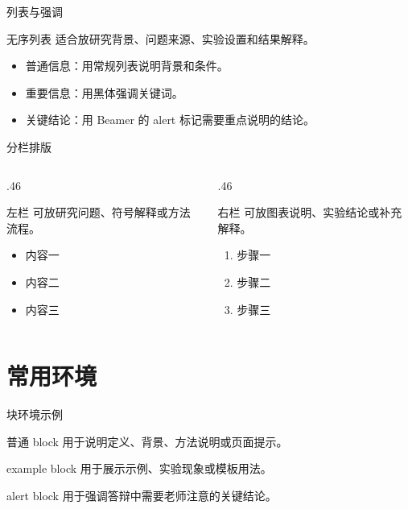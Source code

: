 \documentclass[12pt,aspectratio=43]{beamer}
\newcommand{\JLUEmph}[1]{{\JLUHei #1}}
\newcommand{\JLUSectionTitleThree}{常用环境}
\begin{document}
\begin{frame}{列表与强调}
  \begin{block}{无序列表}
    适合放研究背景、问题来源、实验设置和结果解释。
  \end{block}

  \begin{itemize}
    \item 普通信息：用常规列表说明背景和条件。
    \item \JLUEmph{重要信息}：用黑体强调关键词。
    \item \alert{关键结论}：用 Beamer 的 alert 标记需要重点说明的结论。
  \end{itemize}
\end{frame}

\begin{frame}{分栏排版}
  \begin{columns}[T,totalwidth=\textwidth]
    \begin{column}{.46\textwidth}
      \begin{block}{左栏}
        可放研究问题、符号解释或方法流程。
      \end{block}

      \begin{itemize}
        \item 内容一
        \item 内容二
        \item 内容三
      \end{itemize}
    \end{column}
    \begin{column}{.46\textwidth}
      \begin{block}{右栏}
        可放图表说明、实验结论或补充解释。
      \end{block}

      \begin{enumerate}
        \item 步骤一
        \item 步骤二
        \item 步骤三
      \end{enumerate}
    \end{column}
  \end{columns}
\end{frame}

\section{\JLUSectionTitleThree}

\begin{frame}{块环境示例}
  \begin{block}{普通 block}
    用于说明定义、背景、方法说明或页面提示。
  \end{block}

  \begin{exampleblock}{example block}
    用于展示示例、实验现象或模板用法。
  \end{exampleblock}

  \begin{alertblock}{alert block}
    用于强调答辩中需要老师注意的关键结论。
  \end{alertblock}
\end{frame}
\end{document}
